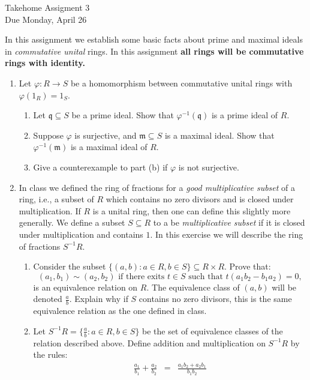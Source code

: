\documentclass[11pt]{article}
\newcommand{\fm}{\mathfrak{m}}
\newcommand{\fq}{\mathfrak{q}}
\begin{document}
\begin{center}
  \Large {Takehome Assigment 3}\\
  \small {Due Monday, April 26}
\end{center}
In this assignment we establish some basic facts about prime and maximal ideals in \textit{commutative unital} rings.  In this assignment \textbf{all rings will be commutative rings with identity.}
\begin{enumerate}
  \item{
  Let $\varphi:R\to S$ be a homomorphism between commutative unital rings with $\varphi(1_R)=1_S$.
  \begin{enumerate}
    \item{
    Let $\fq\subseteq S$ be a prime ideal.  Show that $\varphi^{-1}(\fq)$ is a prime ideal of $R$.
    }
    \item{
    Suppose $\varphi$ is surjective, and $\fm\subseteq S$ is a maximal ideal.  Show that $\varphi^{-1}(\fm)$ is a maximal ideal of $R$.
    }
    \item{
    Give a counterexample to part (b) if $\varphi$ is not surjective.
    }
  \end{enumerate}
  }
  \item{
  In class we defined the ring of fractions for a \textit{good multiplicative subset} of a ring, i.e., a subset of $R$ which contains no zero divisors and is closed under multiplication.  If $R$ is a unital ring, then one can define this slightly more generally.  We define a subset $S\subseteq R$ to a be \textit{multiplicative subset} if it is closed under multiplication and contains $1$.  In this exercise we will describe the ring of fractions $S^{-1}R$.
  \begin{enumerate}
    \item{
    Consider the subset $\{(a,b):a\in R,b\in S\}\subseteq R\times R$.  Prove that:
    \[(a_1,b_1)\sim(a_2,b_2)\text{ if there exits }t\in S\text{ such that }t(a_1b_2-b_1a_2)=0,\]
    is an equivalence relation on $R$.  The equivalence class of $(a,b)$ will be denoted $\frac{a}{b}$.  Explain why if $S$ contains no zero divisors, this is the same equivalence relation as the one defined in class.
    }
    \item{
    Let $S^{-1}R = \{\frac{a}{b}:a\in R,b\in S\}$ be the set of equivalence classes of the relation described above.  Define addition and multiplication on $S^{-1}R$ by the rules:
    \begin{eqnarray*}
      \frac{a_1}{b_1}+\frac{a_2}{b_2} &=& \frac{a_1b_2+a_2b_1}{b_1b_2}\\

\end{eqnarray*}}
\end{enumerate}}
\end{enumerate}
\end{document}
